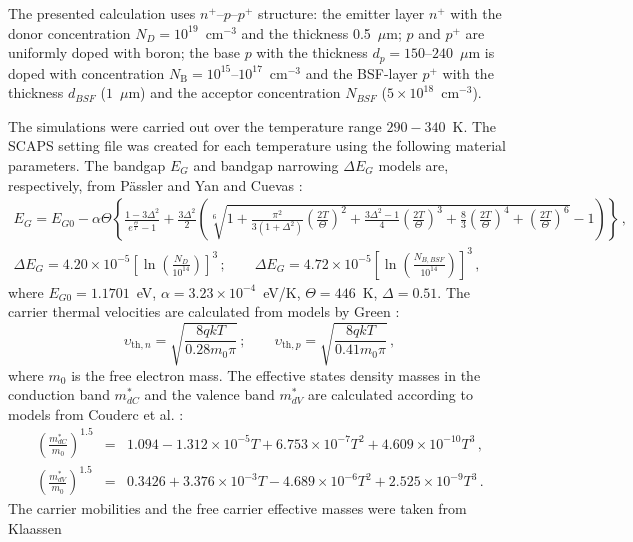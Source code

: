 \documentclass[num-refs]{wiley-article} %
\begin{document}
The presented calculation uses $n^+$--$p$--$p^+$ structure:
the emitter layer $n^+$ with the donor concentration $N_D=10^{19}$~cm$^{-3}$ and
the thickness 0.5~$\mu$m;
$p$ and $p^+$ are uniformly doped with boron;
the base $p$ with the thickness $d_p=150$--$240$~$\mu$m is doped with concentration
$N_\mathrm{B}=10^{15}$--$10^{17}$~cm$^{-3}$
and the BSF-layer $p^+$ with the thickness $d_{BSF}$ ($1$~$\mu$m) and the acceptor
concentration $N_{BSF}$ ($5\times10^{18}$~cm$^{-3}$).

The simulations  were carried out over the temperature range $290-340$~K.
The SCAPS setting file was created for each temperature using the following material parameters.
The bandgap $E_G$ and bandgap narrowing $\Delta E_G$ models are, respectively, from P\"{a}ssler \cite{Pasler} and Yan and Cuevas \cite{EgNarrow}:
\begin{eqnarray}
\label{eqEg}
E_G=E_{G0}-\alpha\Theta\left\{\frac{1-3\Delta^2}{e^{\frac{\Theta}{T}}-1}
    +\frac{3\Delta^2}{2}\left(\sqrt[6]{1+\frac{\pi^2}{3(1+\Delta^2)}\left(\frac{2T}{\Theta}\right)^2
    +\frac{3\Delta^2-1}{4}\left(\frac{2T}{\Theta}\right)^3+\frac{8}{3}\left(\frac{2T}{\Theta}\right)^4
    +\left(\frac{2T}{\Theta}\right)^6}-1\right)\right\}\,,\\
\Delta E_G=4.20\times10^{-5}\left[\ln\left(\frac{N_{D}}{10^{14}}\right)\right]^3\,;\qquad
     \Delta E_G=4.72\times10^{-5}\left[\ln\left(\frac{N_{B,BSF}}{10^{14}}\right)\right]^3\,,
\end{eqnarray}
where
$E_{G0}=1.1701$~eV,
$\alpha=3.23\times10^{-4}$~eV/K,
$\Theta=446$~K,
$\Delta=0.51$.
The carrier thermal velocities are calculated from models by Green \citep{Nc:Green}:
\begin{equation}
\label{eqVth}
    \upsilon_{\mathrm{th},n}=\sqrt{\frac{8qkT}{0.28m_0\pi}}\,;\qquad
    \upsilon_{\mathrm{th},p}=\sqrt{\frac{8qkT}{0.41m_0\pi}}\,,
\end{equation}
where
$m_0$ is the free electron mass.
The effective states density masses in the conduction band $m^*_{dC}$ and
the valence band $m^*_{dV}$ are calculated according to models from Couderc et al. \citep{Si_ni_Couderc}:
\begin{eqnarray}
  \left(\frac{m^*_{dC}}{m_0}\right)^{1.5} &=& 1.094-1.312\times10^{-5}T+6.753\times10^{-7}T^2+4.609\times10^{-10}T^3\,, \\
  \left(\frac{m^*_{dV}}{m_0}\right)^{1.5} &=& 0.3426+3.376\times10^{-3}T-4.689\times10^{-6}T^2+2.525\times10^{-9}T^3\,.
\end{eqnarray}
The carrier mobilities and the free carrier effective masses  were taken from Klaassen \cite{KLAASSEN953}
\end{document}
